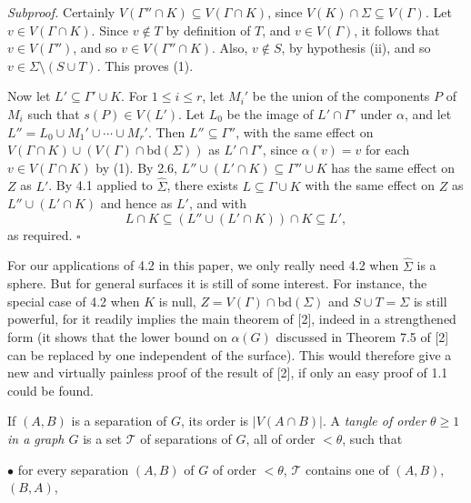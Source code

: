 \textit{Subproof.} Certainly $V(\Gamma'' \cap K) \subseteq V(\Gamma \cap K)$, since $V(K) \cap \Sigma \subseteq V(\Gamma)$. Let $v \in V(\Gamma \cap K)$. Since $v \notin T$ by definition of $T$, and $v \in V(\Gamma)$, it follows that $v \in V(\Gamma'')$, and so $v \in V(\Gamma'' \cap K)$. Also, $v \notin S$, by hypothesis (ii), and so $v \in \Sigma \setminus (S \cup T)$. This proves (1).

Now let $L' \subseteq \Gamma' \cup K$. For $1 \le i \le r$, let $M_i'$ be the union of the components $P$ of $M_i$ such that $s(P) \in V(L')$. Let $L_0$ be the image of $L' \cap \Gamma'$ under $\alpha$, and let $L'' = L_0 \cup M_1' \cup \cdots \cup M_r'$. Then $L'' \subseteq \Gamma''$, with the same effect on $V(\Gamma \cap K) \cup (V(\Gamma) \cap \text{bd}(\Sigma))$ as $L' \cap \Gamma'$, since $\alpha(v) = v$ for each $v \in V(\Gamma \cap K)$ by (1). By 2.6, $L'' \cup (L' \cap K) \subseteq \Gamma'' \cup K$ has the same effect on $Z$ as $L'$. By 4.1 applied to $\hat{\Sigma}$, there exists $L \subseteq \Gamma \cup K$ with the same effect on $Z$ as $L'' \cup (L' \cap K)$ and hence as $L'$, and with
\begin{equation*}
L \cap K \subseteq (L'' \cup (L' \cap K)) \cap K \subseteq L',
\end{equation*}
as required. $\square$

For our applications of 4.2 in this paper, we only really need 4.2 when $\hat{\Sigma}$ is a sphere. But for general surfaces it is still of some interest. For instance, the special case of 4.2 when $K$ is null, $Z = V(\Gamma) \cap \text{bd}(\Sigma)$ and $S \cup T = \Sigma$ is still powerful, for it readily implies the main theorem of [2], indeed in a strengthened form (it shows that the lower bound on $\alpha(G)$ discussed in Theorem 7.5 of [2] can be replaced by one independent of the surface). This would therefore give a new and virtually painless proof of the result of [2], if only an easy proof of 1.1 could be found.


If $(A, B)$ is a separation of $G$, its order is $|V(A \cap B)|$. A \textit{tangle of order $\theta \ge 1$ in a graph $G$} is a set $\mathcal{T}$ of separations of $G$, all of order $< \theta$, such that

\hspace*{12pt}$\bullet$ for every separation $(A, B)$ of $G$ of order $< \theta$, $\mathcal{T}$ contains one of $(A, B)$, $(B, A)$,

